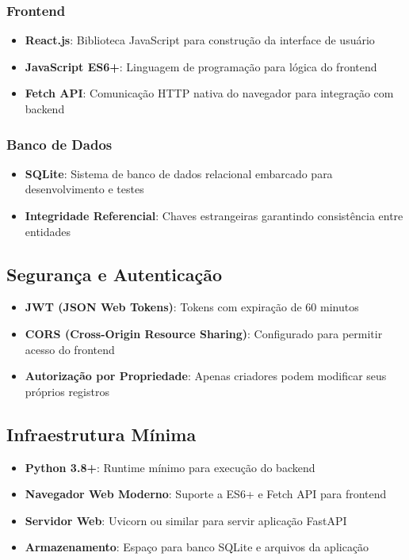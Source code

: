 \documentclass[12pt,a4paper]{article}
\begin{document}
\subsubsection{Frontend}
\begin{itemize}
    \item \textbf{React.js}: Biblioteca JavaScript para construção da interface de usuário
    \item \textbf{JavaScript ES6+}: Linguagem de programação para lógica do frontend
    \item \textbf{Fetch API}: Comunicação HTTP nativa do navegador para integração com backend
\end{itemize}

\subsubsection{Banco de Dados}
\begin{itemize}
    \item \textbf{SQLite}: Sistema de banco de dados relacional embarcado para desenvolvimento e testes
    \item \textbf{Integridade Referencial}: Chaves estrangeiras garantindo consistência entre entidades
\end{itemize}

\subsection{Segurança e Autenticação}
\begin{itemize}
    \item \textbf{JWT (JSON Web Tokens)}: Tokens com expiração de 60 minutos
    \item \textbf{CORS (Cross-Origin Resource Sharing)}: Configurado para permitir acesso do frontend
    \item \textbf{Autorização por Propriedade}: Apenas criadores podem modificar seus próprios registros
\end{itemize}

\subsection{Infraestrutura Mínima}
\begin{itemize}
    \item \textbf{Python 3.8+}: Runtime mínimo para execução do backend
    \item \textbf{Navegador Web Moderno}: Suporte a ES6+ e Fetch API para frontend
    \item \textbf{Servidor Web}: Uvicorn ou similar para servir aplicação FastAPI
    \item \textbf{Armazenamento}: Espaço para banco SQLite e arquivos da aplicação
\end{itemize}
\end{document}
